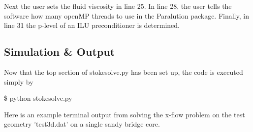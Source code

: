 \documentclass{report}
\begin{document}
\noindent Next the user sets the fluid viscosity in line 25. In line 28, the user tells
the software how many openMP threads to use in the Paralution package.
Finally, in line 31 the p-level of an ILU preconditioner is determined.

\subsection{Simulation \& Output}

Now that the top section of stokesolve.py has been set up, the code
is executed simply by
\begin{mdframed}[style=MyFrame]
\$ python stokesolve.py
\end{mdframed}
Here is an example terminal output from solving the x-flow problem
on the test geometry 'test3d.dat' on a single sandy bridge core.
\end{document}
